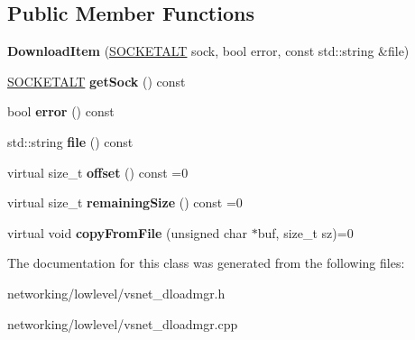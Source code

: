 \subsection*{Public Member Functions}
\begin{DoxyCompactItemize}
\item 
{\bfseries Download\+Item} (\hyperlink{classSOCKETALT}{S\+O\+C\+K\+E\+T\+A\+LT} sock, bool error, const std\+::string \&file)\hypertarget{classVsnetDownload_1_1Server_1_1DownloadItem_abcf626c02930e117798560875d300900}{}\label{classVsnetDownload_1_1Server_1_1DownloadItem_abcf626c02930e117798560875d300900}

\item 
\hyperlink{classSOCKETALT}{S\+O\+C\+K\+E\+T\+A\+LT} {\bfseries get\+Sock} () const \hypertarget{classVsnetDownload_1_1Server_1_1DownloadItem_afe9f1f54215d5193d4a6ff3edf0e1d4c}{}\label{classVsnetDownload_1_1Server_1_1DownloadItem_afe9f1f54215d5193d4a6ff3edf0e1d4c}

\item 
bool {\bfseries error} () const \hypertarget{classVsnetDownload_1_1Server_1_1DownloadItem_a5cf4442ba5b8e1851f5f60d1063c3304}{}\label{classVsnetDownload_1_1Server_1_1DownloadItem_a5cf4442ba5b8e1851f5f60d1063c3304}

\item 
std\+::string {\bfseries file} () const \hypertarget{classVsnetDownload_1_1Server_1_1DownloadItem_a0a5e5776622887f5d4c654c21505dd05}{}\label{classVsnetDownload_1_1Server_1_1DownloadItem_a0a5e5776622887f5d4c654c21505dd05}

\item 
virtual size\+\_\+t {\bfseries offset} () const =0\hypertarget{classVsnetDownload_1_1Server_1_1DownloadItem_a76a17c496fdb756a3524a2d6e53369e1}{}\label{classVsnetDownload_1_1Server_1_1DownloadItem_a76a17c496fdb756a3524a2d6e53369e1}

\item 
virtual size\+\_\+t {\bfseries remaining\+Size} () const =0\hypertarget{classVsnetDownload_1_1Server_1_1DownloadItem_aae0bea7c9524bd741ef8f520b049262c}{}\label{classVsnetDownload_1_1Server_1_1DownloadItem_aae0bea7c9524bd741ef8f520b049262c}

\item 
virtual void {\bfseries copy\+From\+File} (unsigned char $\ast$buf, size\+\_\+t sz)=0\hypertarget{classVsnetDownload_1_1Server_1_1DownloadItem_a587143762114d121ef73ffb677ef32d2}{}\label{classVsnetDownload_1_1Server_1_1DownloadItem_a587143762114d121ef73ffb677ef32d2}

\end{DoxyCompactItemize}


The documentation for this class was generated from the following files\+:\begin{DoxyCompactItemize}
\item 
networking/lowlevel/vsnet\+\_\+dloadmgr.\+h\item 
networking/lowlevel/vsnet\+\_\+dloadmgr.\+cpp\end{DoxyCompactItemize}
